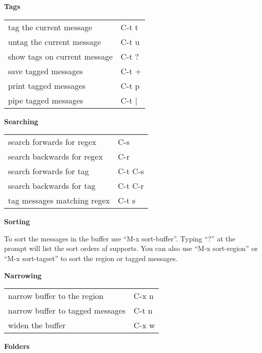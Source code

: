 \documentclass[10pt,a4paper,landscape]{article}
\begin{document}
\begin{multicols}{3}
  {\large \textbf{Tags}}
  \nopagebreak

  \begin{tabular}{p{2.00in}p{0.80in}}
    tag the current message & C-t t \\
    untag the current message & C-t u \\
    show tags on current message & C-t ? \\
    save tagged messages & C-t + \\
    print tagged messages & C-t p \\
    pipe tagged messages & C-t $|$ \\
  \end{tabular}
  \vfill

  {\large \textbf{Searching}}
  \nopagebreak

  \begin{tabular}{p{2.00in}p{0.80in}}
    search forwards for regex & C-s \\
    search backwards for regex & C-r \\
    search forwards for tag & C-t C-s \\
    search backwards for tag & C-t C-r \\
    tag messages matching regex & C-t s \\
  \end{tabular}
  \vfill

  {\large \textbf{Sorting}}
  \nopagebreak

  \parbox{2.80in}{To sort the messages in the buffer use
    ``M-x sort-buffer''.  Typing ``?'' at the prompt will list the
    sort orders af supports.  You can also use ``M-x sort-region''
    or ``M-x sort-tagset'' to sort the region or tagged messages.}
  \vfill

  {\large \textbf{Narrowing}}
  \nopagebreak

  \begin{tabular}{p{2.00in}p{0.80in}}
    narrow buffer to the region & C-x n \\
    narrow buffer to tagged messages & C-t n \\
    widen the buffer & C-x w \\
  \end{tabular}
  \vfill

  {\large \textbf{Folders}}
  \nopagebreak


\end{multicols}
\end{document}
